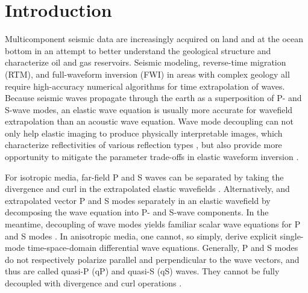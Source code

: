 \section{Introduction}

Multicomponent seismic data are increasingly acquired on land and at the ocean bottom
in an attempt to better understand the geological structure and characterize oil and
gas reservoirs.
Seismic modeling, reverse-time migration (RTM), and full-waveform inversion (FWI) in
areas with complex geology all require high-accuracy numerical algorithms for time
extrapolation of waves.
Because seismic waves propagate through the earth as a superposition of P- and S-wave
modes, an elastic wave equation is usually more accurate for wavefield
extrapolation than an acoustic wave equation.
Wave mode decoupling can not only help elastic imaging to produce physically interpretable images,
which characterize reflectivities of various reflection types \cite[]{wapenaar:1987,dellinger.etgen:1990,yan.sava:2008},
but also provide more opportunity to mitigate the parameter trade-offs in elastic waveform inversion \cite[]{wang.cheng:2015}.

For isotropic media, far-field P and S waves can be separated by
taking the divergence and curl in the extrapolated elastic wavefields
\cite[]{aki.richards:1980,sun.mcmechan:2001}. 
Alternatively, \cite{ma.zhu:2003} and \cite{zhang:2007} extrapolated vector P and S modes separately in an
elastic wavefield by decomposing the wave equation into P- and S-wave components.
In the meantime, decoupling of wave modes yields familiar scalar wave equations
for P and S modes \cite[]{aki.richards:1980}.
In anisotropic media, one cannot, so simply, derive explicit single-mode
time-space-domain differential wave equations.
Generally, P and S modes do not respectively polarize parallel and perpendicular to
the wave vectors, and thus are called quasi-P (qP) and quasi-S (qS) waves. They cannot
be fully decoupled with divergence and curl operations \cite[]{dellinger.etgen:1990}.

